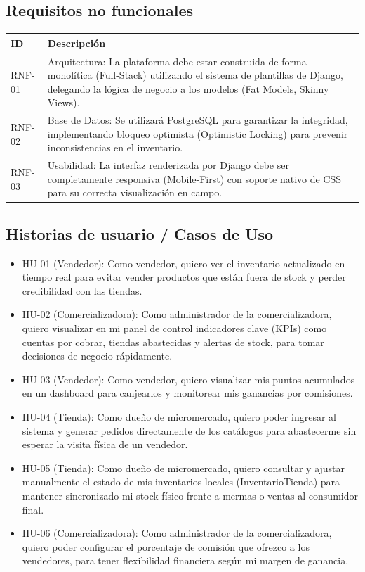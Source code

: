 \documentclass{article}
\begin{document}
\subsection{Requisitos no funcionales} 
\begin{table}[h]
\centering
\begin{tabular}{|l|p{12cm}|}
\hline
\textbf{ID} & \textbf{Descripción} \\ \hline
RNF-01 & Arquitectura: La plataforma debe estar construida de forma monolítica (Full-Stack) utilizando el sistema de plantillas de Django, delegando la lógica de negocio a los modelos (Fat Models, Skinny Views).  \\ \hline
RNF-02 & Base de Datos: Se utilizará PostgreSQL para garantizar la integridad, implementando bloqueo optimista (Optimistic Locking) para prevenir inconsistencias en el inventario.  \\ \hline
RNF-03 & Usabilidad: La interfaz renderizada por Django debe ser completamente responsiva (Mobile-First) con soporte nativo de CSS para su correcta visualización en campo.  \\ \hline
\end{tabular}
\end{table}

\subsection{Historias de usuario / Casos de Uso} 
\begin{itemize}
    \item HU-01 (Vendedor): Como vendedor, quiero ver el inventario actualizado en tiempo real para evitar vender productos que están fuera de stock y perder credibilidad con las tiendas. 
    \item HU-02 (Comercializadora): Como administrador de la comercializadora, quiero visualizar en mi panel de control indicadores clave (KPIs) como cuentas por cobrar, tiendas abastecidas y alertas de stock, para tomar decisiones de negocio rápidamente.
    \item HU-03 (Vendedor): Como vendedor, quiero visualizar mis puntos acumulados en un dashboard para canjearlos y monitorear mis ganancias por comisiones. 
    \item HU-04 (Tienda): Como dueño de micromercado, quiero poder ingresar al sistema y generar pedidos directamente de los catálogos para abastecerme sin esperar la visita física de un vendedor.
    \item HU-05 (Tienda): Como dueño de micromercado, quiero consultar y ajustar manualmente el estado de mis inventarios locales (InventarioTienda) para mantener sincronizado mi stock físico frente a mermas o ventas al consumidor final.
    \item HU-06 (Comercializadora): Como administrador de la comercializadora, quiero poder configurar el porcentaje de comisión que ofrezco a los vendedores, para tener flexibilidad financiera según mi margen de ganancia.
\end{itemize}
\end{document}

